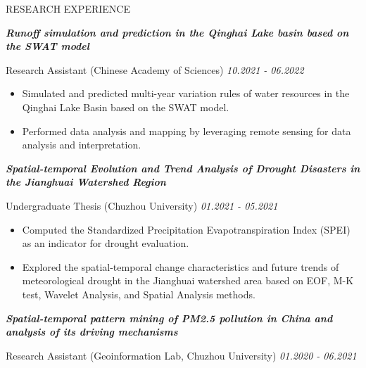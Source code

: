 \documentclass{resume}
\begin{document}
\vspace{-6mm}  
\begin{ResumeSection}{RESEARCH EXPERIENCE}

\textit{\textbf{Runoff simulation and prediction in the Qinghai Lake basin based on the SWAT model} }

Research Assistant (Chinese Academy of Sciences) \hfill{\textit{10.2021 - 06.2022}} 

    \begin{itemize}
        \item Simulated and predicted multi-year variation rules of water resources in the Qinghai Lake Basin based on the SWAT model.
    \end{itemize}

    \begin{itemize}
    
        \item Performed data analysis and mapping by leveraging remote sensing for data analysis and interpretation.
    \end{itemize}


 

\textit{\textbf{Spatial-temporal Evolution and Trend Analysis of Drought Disasters in the Jianghuai Watershed Region} }

Undergraduate Thesis (Chuzhou University)	 \hfill{\textit{01.2021 - 05.2021}} 

    \begin{itemize}
    
        \item Computed the Standardized Precipitation Evapotranspiration Index (SPEI) as an indicator for drought evaluation.
    \end{itemize}

    \begin{itemize}
    
        \item Explored the spatial-temporal change characteristics and future trends of meteorological drought in the Jianghuai watershed area based on EOF, M-K test, Wavelet Analysis, and Spatial Analysis methods.
    \end{itemize}



\textit{\textbf{Spatial-temporal pattern mining of PM2.5 pollution in China and analysis of its driving mechanisms} }

Research Assistant (Geoinformation Lab, Chuzhou University)	 \hfill{\textit{01.2020 - 06.2021}} 


\end{ResumeSection}
\end{document}
